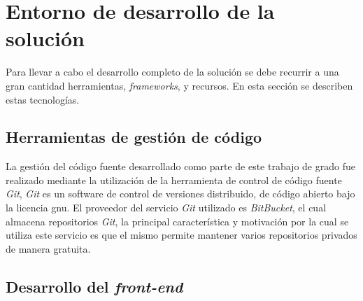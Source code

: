 \section{Entorno de desarrollo de la solución}

Para llevar a cabo el desarrollo completo de la solución se debe recurrir a una 
gran cantidad herramientas, \textit{frameworks}, y recursos. En esta sección se 
describen estas tecnologías.





\subsection{Herramientas de gestión de código}

La gestión del código fuente desarrollado como parte de este trabajo de grado fue realizado
mediante la utilización de la herramienta de control de código fuente
\textit{Git}, \textit{Git} es un software de control de versiones distribuido,
de código abierto bajo la licencia \Gls{gnu}\cite{git}. El proveedor del
servicio \textit{Git} utilizado es \textit{BitBucket}\cite{bitbucket}, el cual
almacena repositorios \textit{Git}, la principal característica y motivación por
la cual se utiliza este servicio es que el mismo permite mantener varios
repositorios privados de manera gratuita\cite{bitbucket}.

\subsection{Desarrollo del \textit{front-end}}

